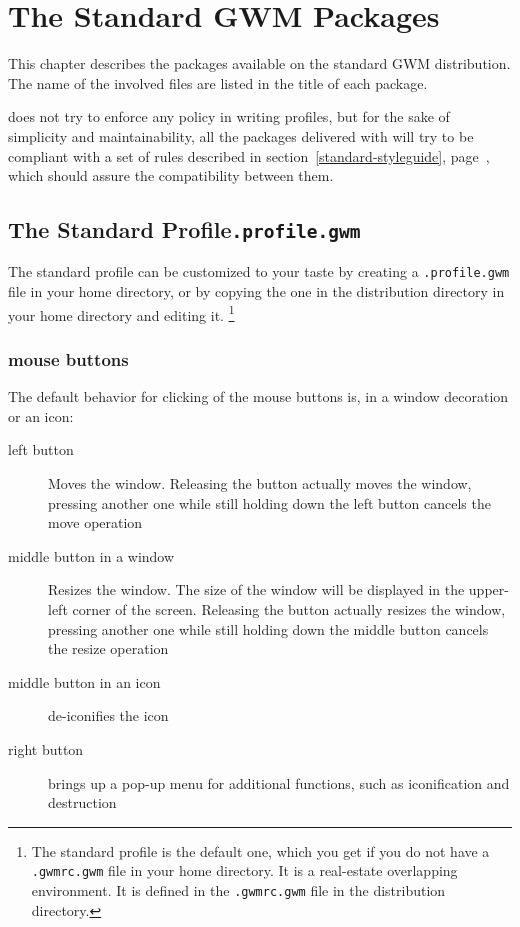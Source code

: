 \chapter{The Standard GWM Packages}

\sloppy

This chapter describes the {\WOOL} packages available on the standard GWM
distribution. The name of the involved files are listed in the title of each
package.

{\GWM} does not try to enforce any policy in writing profiles, but for the
sake of simplicity and maintainability, all the {\WOOL} packages delivered
with {\GWM} will try to be compliant with a set of rules described in
section~\ref{standard-styleguide}, page~\pageref{standard-styleguide}, which
should assure the compatibility between them.

\section{The Standard Profile\hfill{\tt .profile.gwm}}
\label{standard-profile}

The standard profile can be customized to your taste by creating a
\verb".profile.gwm" file in your home directory, or by copying the one in
the {\GWM} distribution directory in your home directory and editing it.
\footnote{The standard profile is the default one, which you get if you do
not have a \verb".gwmrc.gwm" file in your home directory. It is a
real-estate overlapping environment. It is defined in the \verb".gwmrc.gwm"
file in the {\GWM} distribution directory.}

\subsection{mouse buttons}

The default behavior for clicking of the mouse buttons is, in a window
decoration or an icon:

\begin{description}

\item[left button] Moves the window. Releasing the button actually moves the
window, pressing another one while still holding down the left button
cancels the move operation

\item[middle button in a window] Resizes the window. The size of the window
will be displayed in the upper-left corner of the screen. Releasing the
button actually resizes the window, pressing another one while still holding
down the middle button cancels the resize operation

\item[middle button in an icon] de-iconifies the icon

\item[right button] brings up a pop-up menu for additional functions, such
as iconification and destruction

\end{description} 

